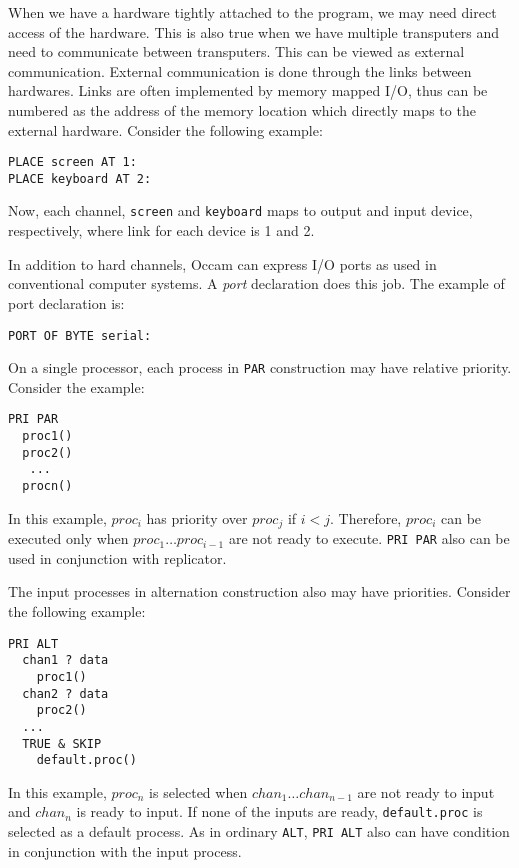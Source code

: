 
When we have a hardware tightly attached to the program, we may need
direct access of the hardware.  This is also true when we have
multiple transputers and need to communicate between transputers.
This can be viewed as external communication.
External communication is done through the links between hardwares.
Links are often implemented by memory mapped I/O, thus can be numbered
as the address of the memory location which directly maps to the
external hardware.  Consider the following example:
\begin{lin}
\begin{verbatim}
PLACE screen AT 1:
PLACE keyboard AT 2:
\end{verbatim}
\end{lin}
Now, each channel, {\tt screen} and {\tt keyboard} maps to output
and input device, respectively, where link for each device is 1 and 2.

In addition to hard channels, Occam can express I/O ports as used in
conventional computer systems.  A {\em port} declaration does this
job.  The example of port declaration is:
\begin{lin}
\begin{verbatim}
PORT OF BYTE serial:
\end{verbatim}
\end{lin}


On a single processor, each process in {\tt PAR} construction may have
relative priority.  Consider the example:
\begin{lin}
\begin{verbatim}
PRI PAR 
  proc1()
  proc2()
   ...
  procn()
\end{verbatim}
\end{lin}
In this example, $proc_{i}$ has priority over $proc_{j}$ if $i < j$.
Therefore, $proc_{i}$ can be executed only when $proc_{1} \ldots
proc_{i-1}$ are not ready to execute.  {\tt PRI PAR} also can be used in
conjunction with replicator.

The input processes in alternation construction also may have priorities.
Consider the following example:
\begin{lin}
\begin{verbatim}
PRI ALT
  chan1 ? data
    proc1()
  chan2 ? data
    proc2()
  ...
  TRUE & SKIP
    default.proc()
\end{verbatim}
\end{lin}
In this example, $proc_{n}$ is selected when $chan_{1} \ldots
chan_{n-1}$ are not ready to input and $chan_{n}$ is ready to input.
If none of the inputs are ready, {\tt default.proc} is selected as a
default process.  As in ordinary {\tt ALT}, {\tt PRI ALT}  also can
have condition in conjunction with the input process.

